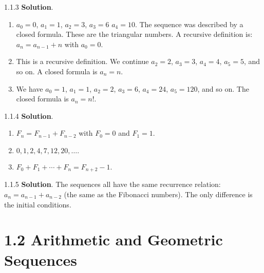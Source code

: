 \documentclass[11pt,]{book}
\theoremstyle{ptxplainnotitle}
\theoremstyle{ptxplaintitle}
\theoremstyle{ptxdefinitionnotitle}
\theoremstyle{ptxdefinitiontitle}
\theoremstyle{ptxdefinitionnotitle}
\theoremstyle{ptxdefinitiontitle}
\theoremstyle{ptxdefinitionnotitle}
\theoremstyle{ptxdefinitiontitle}
\theoremstyle{ptxdefinitiontitlenonumber}
\theoremstyle{ptxdefinitiontitlenonumber}
\numberwithin{equation}{chapter}
\begin{document}
\begin{divisionexercise}{1.1.3}
\textbf{Solution}.\quad%
\hypertarget{p-125}{}%
\leavevmode%
\begin{enumerate}[label=(\alph*)]
\item\hypertarget{li-85}{}\hypertarget{p-126}{}%
\(a_0 = 0\), \(a_1 = 1\), \(a_2 = 3\), \(a_3 = 6\)  \(a_4 = 10\). The sequence was described by a closed formula.  These are the triangular numbers.  A recursive definition is: \(a_n = a_{n-1} + n\) with \(a_0 = 0\).%
\item\hypertarget{li-86}{}\hypertarget{p-127}{}%
This is a recursive definition.  We continue \(a_2 = 2\), \(a_3 = 3\), \(a_4 = 4\), \(a_5 = 5\), and so on.  A closed formula is \(a_n = n\).%
\item\hypertarget{li-87}{}\hypertarget{p-128}{}%
We have \(a_0 = 1\), \(a_1 = 1\), \(a_2 = 2\), \(a_3 = 6\), \(a_4 = 24\), \(a_5 = 120\), and so on.  The closed formula is \(a_n = n!\).%
\end{enumerate}
%
\end{divisionexercise}%
\begin{divisionexercise}{1.1.4}
\textbf{Solution}.\quad%
\hypertarget{p-133}{}%
\leavevmode%
\begin{enumerate}[label=(\alph*)]
\item\hypertarget{li-91}{}\(F_n = F_{n-1} + F_{n-2}\) with \(F_0 = 0\) and \(F_1 = 1\).%
\item\hypertarget{li-92}{}\(0, 1, 2, 4, 7, 12, 20, \ldots.\)%
\item\hypertarget{li-93}{}\(F_0 + F_1 + \cdots + F_n = F_{n+2} - 1.\)%
\end{enumerate}
%
\end{divisionexercise}%
\begin{divisionexercise}{1.1.5}
\textbf{Solution}.\quad%
\hypertarget{p-135}{}%
The sequences all have the same recurrence relation: \(a_n = a_{n-1} + a_{n-2}\) (the same as the Fibonacci numbers). The only difference is the initial conditions.%
\end{divisionexercise}%
\section*{1.2 Arithmetic and Geometric Sequences}
\end{document}
